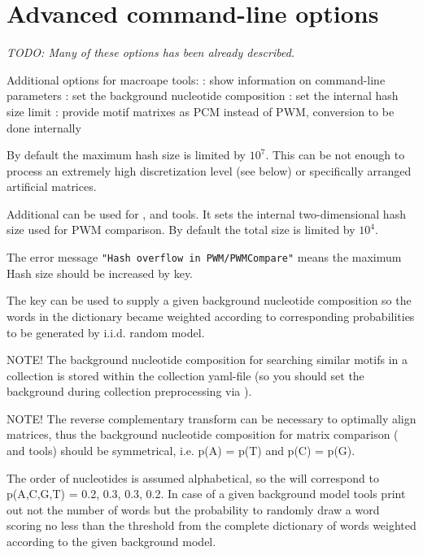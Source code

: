 \section{Advanced command-line options}
\emph{TODO: Many of these options has been already described.}

Additional options for macroape tools:
: show information on command-line parameters
: set the background nucleotide composition
: set the internal hash size limit
: provide motif matrixes as PCM instead of PWM, conversion to be done internally

By default the maximum hash size is limited by $10^7$. This can be not enough to process an 
extremely high discretization level (see below) or specifically arranged artificial matrices.

Additional  can be used for , 
 and  tools. It sets the internal two-dimensional hash size used 
for PWM comparison. By default the total size is limited by $10^4$.

The error message \texttt{"Hash overflow in PWM/PWMCompare"} means the maximum Hash 
size should be increased by  key.

The  key can be used to supply a given background nucleotide composition so 
the words in the dictionary became weighted according to corresponding probabilities to be 
generated by i.i.d. random model.

NOTE! The background nucleotide composition for searching similar motifs in a collection 
is stored within the collection yaml-file (so you should set the background during collection 
preprocessing via ).

NOTE! The reverse complementary transform can be necessary to optimally align matrices, 
thus the background nucleotide composition for matrix comparison ( and 
 tools) should be symmetrical, i.e. p(A) = p(T) and p(C) = p(G).

The order of nucleotides is assumed alphabetical, so the  will 
correspond to p(A,C,G,T) = {0.2, 0.3, 0.3, 0.2}. In case of a given background model tools print 
out not the number of words but the probability to randomly draw a word scoring no less than 
the threshold from the complete dictionary of words weighted according to the given background 
model.

